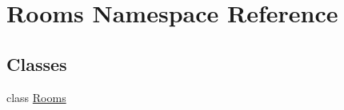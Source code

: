 \hypertarget{namespaceRooms}{}\section{Rooms Namespace Reference}
\label{namespaceRooms}
\subsection*{Classes}
\begin{DoxyCompactItemize}
\item 
class \hyperlink{classRooms_1_1Rooms}{Rooms}
\end{DoxyCompactItemize}

